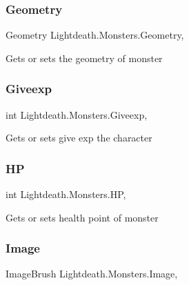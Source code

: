 \subsubsection{\texorpdfstring{Geometry}{Geometry}}
{\footnotesize\ttfamily Geometry Lightdeath.\+Monsters.\+Geometry\hspace{0.3cm}{\ttfamily [get]}, {\ttfamily [set]}}



Gets or sets the geometry of monster 

\hypertarget{class_lightdeath_1_1_monsters_a43054a345f7078a0bc288e668ea7d6c5}{}\label{class_lightdeath_1_1_monsters_a43054a345f7078a0bc288e668ea7d6c5} 
\subsubsection{\texorpdfstring{Giveexp}{Giveexp}}
{\footnotesize\ttfamily int Lightdeath.\+Monsters.\+Giveexp\hspace{0.3cm}{\ttfamily [get]}, {\ttfamily [set]}}



Gets or sets give exp the character 

\hypertarget{class_lightdeath_1_1_monsters_a53eb57a1d9229f840ed8dbd183b50aa2}{}\label{class_lightdeath_1_1_monsters_a53eb57a1d9229f840ed8dbd183b50aa2} 
\subsubsection{\texorpdfstring{HP}{HP}}
{\footnotesize\ttfamily int Lightdeath.\+Monsters.\+HP\hspace{0.3cm}{\ttfamily [get]}, {\ttfamily [set]}}



Gets or sets health point of monster 

\hypertarget{class_lightdeath_1_1_monsters_a6b01d464532c72ecf49b52f2cd35765d}{}\label{class_lightdeath_1_1_monsters_a6b01d464532c72ecf49b52f2cd35765d} 
\subsubsection{\texorpdfstring{Image}{Image}}
{\footnotesize\ttfamily Image\+Brush Lightdeath.\+Monsters.\+Image\hspace{0.3cm}{\ttfamily [get]}, {\ttfamily [set]}}



